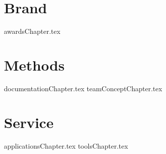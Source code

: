 \documentclass[letterpaper, 12pt]{memoir}  %
\begin{document}
\begin{titlingpage}
\titleM  %
\end{titlingpage}
\frontmatter %
\pagestyle{empty} %
\setmarginnotes{.1in}{.4in}{.1in}
\setulmarginsandblock{1in}{1in}{*}
\checkandfixthelayout
\makeatletter
\ch@ngetext
\makeatletter
\tableofcontents %
\mainmatter %
\pagestyle{jalapenoPageStyleA} %
\part{Brand}
{awardsChapter.tex}
\part{Methods}
{documentationChapter.tex}
{teamConceptChapter.tex}
\part{Service}
{applicationsChapter.tex}
{toolsChapter.tex}
\end{document}
